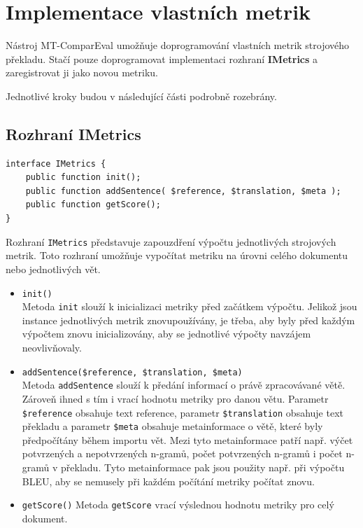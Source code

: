\section{Implementace vlastních metrik}
\label{chap:own-metrics}

Nástroj \mbox{MT-ComparEval} umožňuje doprogramování vlastních metrik strojového překladu.
Stačí pouze doprogramovat implementaci rozhraní \textbf{IMetrics} a
  zaregistrovat ji jako novou metriku.

Jednotlivé kroky budou v následující části podrobně rozebrány.

\subsection{Rozhraní IMetrics}
\begin{verbatim}
interface IMetrics {
    public function init();
    public function addSentence( $reference, $translation, $meta );
    public function getScore();
}
\end{verbatim}

Rozhraní \texttt{IMetrics} představuje zapouzdření výpočtu jednotlivých strojových metrik.
Toto rozhraní umožňuje vypočítat metriku na úrovni celého dokumentu nebo jednotlivých vět.

\begin{itemize}
	\item \texttt{init()} \\
		Metoda \texttt{init} slouží k inicializaci metriky před začátkem výpočtu.	
		Jelikož jsou instance jednotlivých metrik znovupoužívány,
		  je třeba,
		  aby byly před každým výpočtem znovu inicializovány,
		  aby se jednotlivé výpočty navzájem neovlivňovaly.

	
	\item \texttt{addSentence(\$reference, \$translation, \$meta)} \\
		Metoda \texttt{addSentence} slouží k předání informací o právě zpracovávané větě.
		Zároveň ihned s tím i vrací hodnotu metriky pro danou větu.
		Parametr \texttt{\$reference} obsahuje text reference, 
                  parametr \texttt{\$translation} obsahuje text překladu a
                  parametr \texttt{\$meta} obsahuje metainformace o větě,
                  které byly předpočítány během importu vět.
                Mezi tyto metainformace patří např. výčet potvrzených a nepotvrzených \mbox{n-gramů},
                  počet potvrzených \mbox{n-gramů} i počet \mbox{n-gramů} v překladu.
		Tyto metainformace pak jsou použity např. při výpočtu BLEU,
		  aby se nemusely při každém počítání metriky počítat znovu.

	\item \texttt{getScore()}
		Metoda \texttt{getScore} vrací výslednou hodnotu metriky pro celý dokument.
 
\end{itemize}


